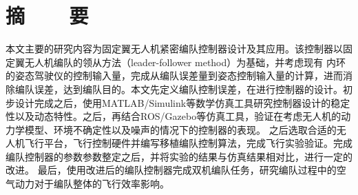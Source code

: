 %
%
%
%
%

\topskip=0pt

\vspace*{-7mm}

\begin{center}
  \heiti{}\textbf{\thesisTitle}
\end{center}

\vspace*{2mm}

{\let\clearpage\relax \chapter*{\textmd{摘~~~~要}}}
\setcounter{page}{1}

\vspace*{1mm}

\setlength{\parskip}{0em}

本文主要的研究内容为固定翼无人机紧密编队控制器设计及其应用。该控制器以固定翼无人机编队的领从方法（leader-follower method）为基础，并考虑现有
内环的姿态驾驶仪的控制输入量，完成从编队误差量到姿态控制输入量的计算，进而消除编队误差，达到编队目的。本文先定义编队控制误差，在进行控制器的设计。初步设计完成之后，使用MATLAB/Simulink等数学仿真工具研究控制器设计的稳定性以及动态特性。之后，再结合ROS/Gazebo等仿真工具，验证在考虑无人机的动力学模型、环境不确定性以及噪声的情况下的控制器的表现。
之后选取合适的无人机飞行平台，飞行控制硬件并编写移植编队控制算法，完成飞行实验验证。完成编队控制器的参数参数整定之后，并将实验的结果与仿真结果相对比，进行一定的改进。
最后，使用改进后的编队控制器完成双机编队任务，研究编队过程中的空气动力对于编队整体的飞行效率影响。

